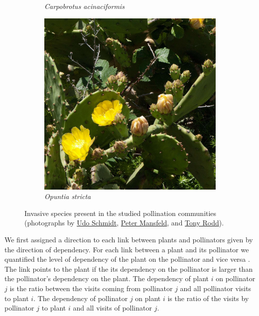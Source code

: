 \documentclass[a4paper,10pt]{article}
\begin{document}
\begin{figure}
\begin{subfigure}{0.3\textwidth}
        \caption{\textit{Carpobrotus acinaciformis}}
    \end{subfigure}
    \hfill
    \begin{subfigure}{0.3\textwidth}
        \centering
        \includegraphics[width=\textwidth]{Opuntia_stricta}
        \caption{\textit{Opuntia stricta}}
    \end{subfigure}
    \hfill
    \caption{
    Invasive species present in the studied pollination communities (photographs by \href{https://commons.wikimedia.org/wiki/File:Impatiens_glandulifera_Royle_(7677070626).jpg}{Udo Schmidt}, \href{https://commons.wikimedia.org/wiki/File:Carpobrotus_acinaciformis_pm.jpg}{Peter Mansfeld}, and \href{https://www.flickr.com/photos/tony_rodd/5265326818}{Tony Rodd}).
    }
    \label{fig:photographs}
\end{figure} 

We first assigned a direction to each link between plants and pollinators given by the direction of dependency. For each link between a plant and its pollinator we quantified the level of dependency of the plant on the pollinator and vice versa \autocite{Bascompte2006}. The link points to the plant if the its dependency on the pollinator is larger than the pollinator's dependency on the plant. The dependency of plant $i$ on pollinator $j$ is the ratio between the visits coming from pollinator $j$ and all pollinator visits to plant $i$. The dependency of pollinator $j$ on plant $i$ is the ratio of the visits by pollinator $j$ to plant $i$ and all visits of pollinator $j$. 
\end{document}
